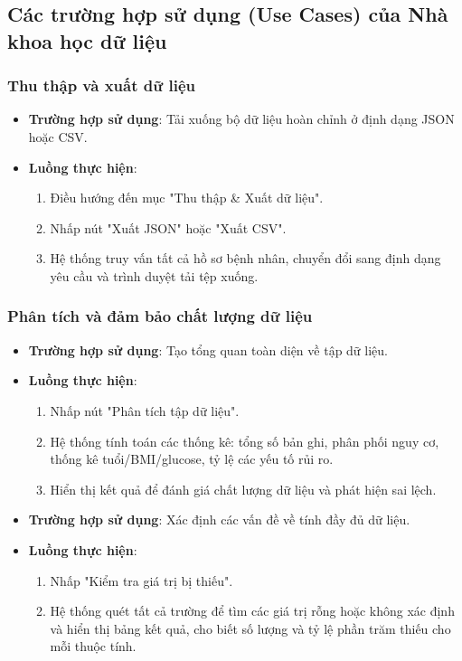 ﻿\documentclass{article}
\begin{document}
\subsection{Các trường hợp sử dụng (Use Cases) của Nhà khoa học dữ liệu}
\subsubsection{Thu thập và xuất dữ liệu}
\begin{itemize}
    \item \textbf{Trường hợp sử dụng}: Tải xuống bộ dữ liệu hoàn chỉnh ở định dạng JSON hoặc CSV.
    \item \textbf{Luồng thực hiện}:
        \begin{enumerate}
            \item Điều hướng đến mục "Thu thập \& Xuất dữ liệu".
            \item Nhấp nút "Xuất JSON" hoặc "Xuất CSV".
            \item Hệ thống truy vấn tất cả hồ sơ bệnh nhân, chuyển đổi sang định dạng yêu cầu và trình duyệt tải tệp xuống.
        \end{enumerate}
\end{itemize}

\subsubsection{Phân tích và đảm bảo chất lượng dữ liệu}
\begin{itemize}
    \item \textbf{Trường hợp sử dụng}: Tạo tổng quan toàn diện về tập dữ liệu.
    \item \textbf{Luồng thực hiện}:
        \begin{enumerate}
            \item Nhấp nút "Phân tích tập dữ liệu".
            \item Hệ thống tính toán các thống kê: tổng số bản ghi, phân phối nguy cơ, thống kê tuổi/BMI/glucose, tỷ lệ các yếu tố rủi ro.
            \item Hiển thị kết quả để đánh giá chất lượng dữ liệu và phát hiện sai lệch.
        \end{enumerate}
    \item \textbf{Trường hợp sử dụng}: Xác định các vấn đề về tính đầy đủ dữ liệu.
    \item \textbf{Luồng thực hiện}:
        \begin{enumerate}
            \item Nhấp "Kiểm tra giá trị bị thiếu".
            \item Hệ thống quét tất cả trường để tìm các giá trị rỗng hoặc không xác định và hiển thị bảng kết quả, cho biết số lượng và tỷ lệ phần trăm thiếu cho mỗi thuộc tính.
        \end{enumerate}
\end{itemize}
\end{document}

